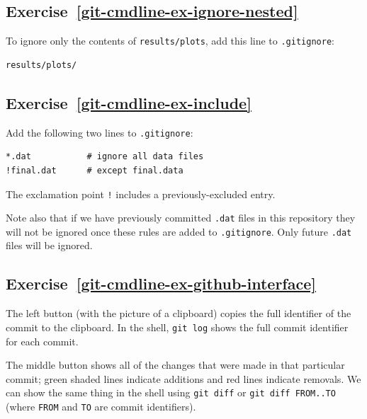 \documentclass[
]{krantz}
\begin{document}
\hypertarget{exercise-refgit-cmdline-ex-ignore-nested}{%
\subsection*{Exercise~\ref{git-cmdline-ex-ignore-nested}}\label{exercise-refgit-cmdline-ex-ignore-nested}}


To ignore only the contents of \texttt{results/plots},
add this line to \texttt{.gitignore}:

\begin{verbatim}
results/plots/
\end{verbatim}

\hypertarget{exercise-refgit-cmdline-ex-include}{%
\subsection*{Exercise~\ref{git-cmdline-ex-include}}\label{exercise-refgit-cmdline-ex-include}}


Add the following two lines to \texttt{.gitignore}:

\begin{verbatim}
*.dat           # ignore all data files
!final.dat      # except final.data
\end{verbatim}

The exclamation point \texttt{!} includes a previously-excluded entry.

Note also that if we have previously committed \texttt{.dat} files in this repository
they will not be ignored once these rules are added to \texttt{.gitignore}.
Only future \texttt{.dat} files will be ignored.

\hypertarget{exercise-refgit-cmdline-ex-github-interface}{%
\subsection*{Exercise~\ref{git-cmdline-ex-github-interface}}\label{exercise-refgit-cmdline-ex-github-interface}}


The left button (with the picture of a clipboard)
copies the full identifier of the commit to the clipboard.
In the shell,
\texttt{git\ log} shows the full commit identifier for each commit.

The middle button shows all of the changes that were made in that particular commit;
green shaded lines indicate additions and red lines indicate removals.
We can show the same thing in the shell using \texttt{git\ diff}
or \texttt{git\ diff\ FROM..TO}
(where \texttt{FROM} and \texttt{TO} are commit identifiers).
\end{document}
